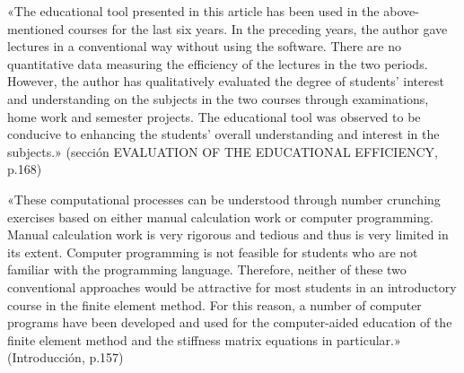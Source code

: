 \documentclass[11pt,a4paper]{article}
\newcommand{\campo}[1]{\textcolor{gris}{\footnotesize #1}}
\begin{document}
\vspace{3pt}\noindent{\small\textbf{p.\ 168} \quad \campo{«los criterios de diseño pedagógico se fundamentan cualitativamente en la literatura sobre enseñanza del MEF» --- tesis/capitulos/01\_introduccion.tex:56}}\par
\begin{pasaje}\footnotesize «The educational tool presented in this article has been used in the above-mentioned courses for the last six years. In the preceding years, the author gave lectures in a conventional way without using the software. There are no quantitative data measuring the efficiency of the lectures in the two periods. However, the author has qualitatively evaluated the degree of students' interest and understanding on the subjects in the two courses through examinations, home work and semester projects. The educational tool was observed to be conducive to enhancing the students' overall understanding and interest in the subjects.» (sección EVALUATION OF THE EDUCATIONAL EFFICIENCY, p.168)\end{pasaje}
\vspace{3pt}\noindent{\small\textbf{p.\ 157} \quad \campo{«las herramientas profesionales son cajas negras optimizadas para producir resultados, no para revelar el procedimiento intermedio, mientras que el desarrollo puramente manual no escala más allá de uno o dos elementos. La investigación educativa documenta esta brecha y propone el software específicamente didáctico como puente...}}\par
\begin{pasaje}\footnotesize «These computational processes can be understood through number crunching exercises based on either manual calculation work or computer programming. Manual calculation work is very rigorous and tedious and thus is very limited in its extent. Computer programming is not feasible for students who are not familiar with the programming language. Therefore, neither of these two conventional approaches would be attractive for most students in an introductory course in the finite element method. For this reason, a number of computer programs have been developed and used for the computer-aided education of the finite element method and the stiffness matrix equations in particular.» (Introducción, p.157)\end{pasaje}
\vspace{3pt}\noindent{\small\textbf{p.\ 157 (título y resumen) y 168...} \quad \campo{«Lee desarrolla simuladores interactivos del procesamiento de las ecuaciones de elementos finitos» --- tesis/capitulos/02\_marco\_teorico.tex:11}}\par
\end{document}
